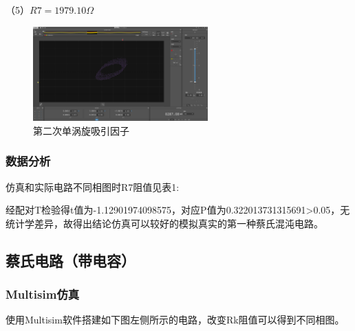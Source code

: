 \documentclass[10pt,a4paper,twoside,UTF8]{ctexart}
\begin{document}
（5）$R7=1979.10\Omega$
\begin{figure}[H]
	\centering
	\includegraphics[width=0.6\textwidth]{C9.2/2nd.PNG}
	\caption{第二次单涡旋吸引因子}	
\end{figure}

\subsubsection*{数据分析}
仿真和实际电路不同相图时R7阻值见表1:

\begin{table}[H]
	\label{tab:1}%
	\caption{仿真和实际电路不同相图时R7阻值（单位：$\Omega$）}
  \end{table}%

经配对T检验得t值为-1.12901974098575，对应P值为0.322013731315691>0.05，无统计学差异，故得出结论仿真可以较好的模拟真实的第一种蔡氏混沌电路。

\subsection{蔡氏电路（带电容）}
\subsubsection{Multisim仿真}
使用Multisim软件搭建如下图左侧所示的电路，改变Rk阻值可以得到不同相图。
\end{document}
